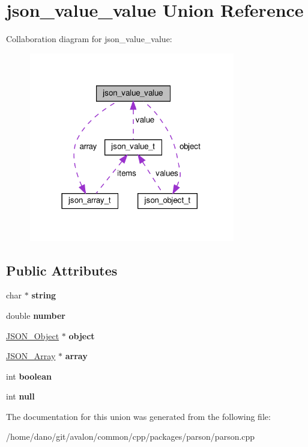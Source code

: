 \hypertarget{unionjson__value__value}{}\section{json\+\_\+value\+\_\+value Union Reference}
\label{unionjson__value__value}


Collaboration diagram for json\+\_\+value\+\_\+value\+:
\nopagebreak
\begin{figure}[H]
\begin{center}
\leavevmode
\includegraphics[width=254pt]{unionjson__value__value__coll__graph}
\end{center}
\end{figure}
\subsection*{Public Attributes}
\begin{DoxyCompactItemize}
\item 
\mbox{\label{unionjson__value__value_a21fc56f46e871b7f8dfa2ddc06d9038a}} 
char $\ast$ {\bfseries string}
\item 
\mbox{\label{unionjson__value__value_a56bf6089e42bff24cf770b4c51588408}} 
double {\bfseries number}
\item 
\mbox{\label{unionjson__value__value_ae575642882ec8b1d180bb511130e5a2b}} 
\hyperlink{structjson__object__t}{J\+S\+O\+N\+\_\+\+Object} $\ast$ {\bfseries object}
\item 
\mbox{\label{unionjson__value__value_aaba35eb35f79f52a8ad578c123bca7e4}} 
\hyperlink{structjson__array__t}{J\+S\+O\+N\+\_\+\+Array} $\ast$ {\bfseries array}
\item 
\mbox{\label{unionjson__value__value_acca4e991a59beb235c6c2bd93fecdb35}} 
int {\bfseries boolean}
\item 
\mbox{\label{unionjson__value__value_a2dc95db295e79877d9524b8df1143b16}} 
int {\bfseries null}
\end{DoxyCompactItemize}


The documentation for this union was generated from the following file\+:\begin{DoxyCompactItemize}
\item 
/home/dano/git/avalon/common/cpp/packages/parson/parson.\+cpp\end{DoxyCompactItemize}

